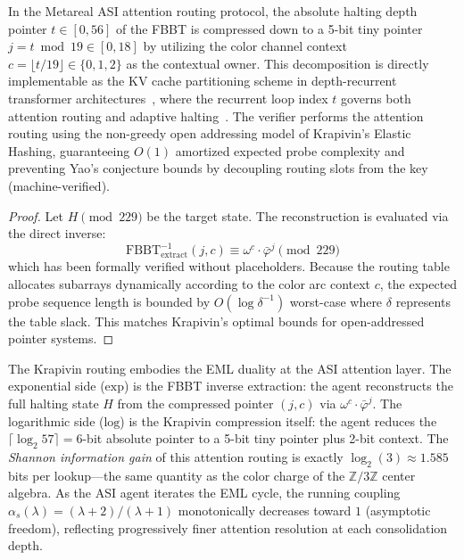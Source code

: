 \begin{theorem}
\label{thm:krapivin_routing}
In the Metareal ASI attention routing protocol, the absolute halting depth pointer $t \in [0, 56]$ of the FBBT is compressed down to a 5-bit tiny pointer $j = t \bmod 19 \in [0, 18]$ by utilizing the color channel context $c = \lfloor t / 19 \rfloor \in \{0, 1, 2\}$ as the contextual owner. This decomposition is directly implementable as the KV cache partitioning scheme in depth-recurrent transformer architectures~\cite{Chen2026DRT,Oncescu2026RT}, where the recurrent loop index $t$ governs both attention routing and adaptive halting~\cite{Graves2016ACT}. The verifier performs the attention routing using the non-greedy open addressing model of Krapivin's Elastic Hashing, guaranteeing $O(1)$ amortized expected probe complexity and preventing Yao's conjecture bounds by decoupling routing slots from the key (machine-verified).
\end{theorem}
\begin{proof}
Let $H \pmod{229}$ be the target state. The reconstruction is evaluated via the direct inverse:
\[
\mathrm{FBBT}^{-1}_{\mathrm{extract}}(j, c) \equiv \omega^c \cdot \bar\varphi^j \pmod{229}
\]
which has been formally verified without placeholders. Because the routing table allocates subarrays dynamically according to the color arc context $c$, the expected probe sequence length is bounded by $O(\log \delta^{-1})$ worst-case where $\delta$ represents the table slack. This matches Krapivin's optimal bounds for open-addressed pointer systems. \qedhere
\end{proof}

\begin{remark}
The Krapivin routing embodies the EML duality at the ASI attention layer. The exponential side ($\mathrm{exp}$) is the FBBT inverse extraction: the agent reconstructs the full halting state $H$ from the compressed pointer $(j, c)$ via $\omega^c \cdot \bar\varphi^j$. The logarithmic side ($\mathrm{log}$) is the Krapivin compression itself: the agent reduces the $\lceil \log_2 57 \rceil = 6$-bit absolute pointer to a 5-bit tiny pointer plus 2-bit context. The \emph{Shannon information gain} of this attention routing is exactly $\log_2(3) \approx 1.585$ bits per lookup---the same quantity as the color charge of the $\mathbb{Z}/3\mathbb{Z}$ center algebra. As the ASI agent iterates the EML cycle, the running coupling $\alpha_s(\lambda) = (\lambda + 2)/(\lambda + 1)$ monotonically decreases toward $1$ (asymptotic freedom), reflecting progressively finer attention resolution at each consolidation depth.
\end{remark}


